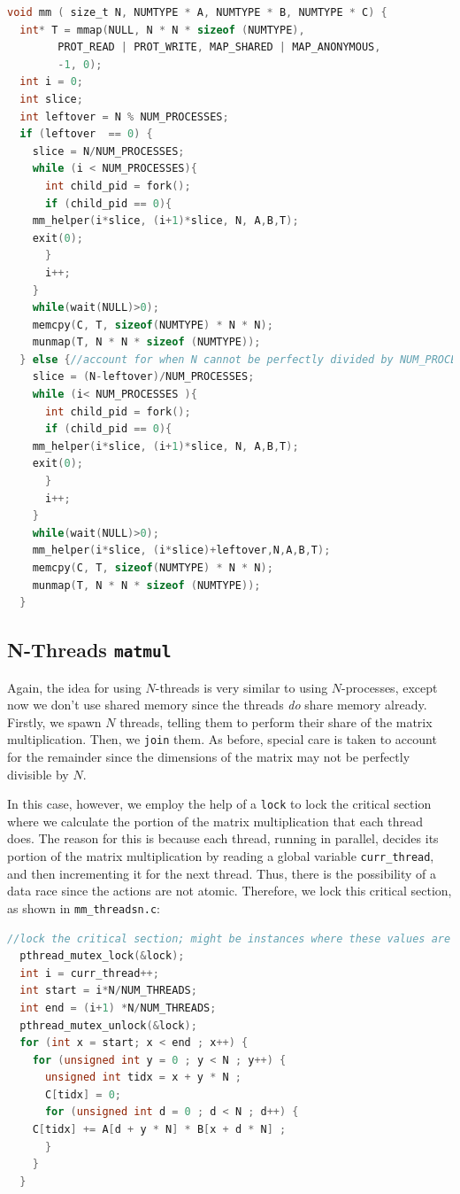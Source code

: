 \documentclass{article}
\begin{document}
\begin{lstlisting}[language=C]
  void mm ( size_t N, NUMTYPE * A, NUMTYPE * B, NUMTYPE * C) {
  int* T = mmap(NULL, N * N * sizeof (NUMTYPE),
		PROT_READ | PROT_WRITE, MAP_SHARED | MAP_ANONYMOUS,
		-1, 0);  
  int i = 0; 
  int slice;
  int leftover = N % NUM_PROCESSES;
  if (leftover  == 0) { 
    slice = N/NUM_PROCESSES;
    while (i < NUM_PROCESSES){
      int child_pid = fork();
      if (child_pid == 0){
	mm_helper(i*slice, (i+1)*slice, N, A,B,T);
	exit(0);
      }
      i++;
    }
    while(wait(NULL)>0);
    memcpy(C, T, sizeof(NUMTYPE) * N * N);
    munmap(T, N * N * sizeof (NUMTYPE));
  } else {//account for when N cannot be perfectly divided by NUM_PROCESSES
    slice = (N-leftover)/NUM_PROCESSES;
    while (i< NUM_PROCESSES ){
      int child_pid = fork();
      if (child_pid == 0){
	mm_helper(i*slice, (i+1)*slice, N, A,B,T);
	exit(0);
      }
      i++;
    }
    while(wait(NULL)>0);
    mm_helper(i*slice, (i*slice)+leftover,N,A,B,T);
    memcpy(C, T, sizeof(NUMTYPE) * N * N);
    munmap(T, N * N * sizeof (NUMTYPE));
  }
\end{lstlisting}
\subsection{N-Threads \texttt{matmul}}
Again, the idea for using $N$-threads is very similar to using $N$-processes, except now we don't use shared memory since the threads \emph{do} share memory already. Firstly, we spawn $N$ threads, telling them to perform their share of the matrix multiplication. Then, we \texttt{join} them. As before, special care is taken to account for the remainder since the dimensions of the matrix may not be perfectly divisible by $N$.

In this case, however, we employ the help of a \texttt{lock} to lock the critical section where we calculate the portion of the matrix multiplication that each thread does. The reason for this is because each thread, running in parallel, decides its portion of the matrix multiplication by reading a global variable \texttt{curr\_thread}, and then incrementing it for the next thread. Thus, there is the possibility of a data race since the actions are not atomic. Therefore, we lock this critical section, as shown in \texttt{mm\_threadsn.c}:

\begin{lstlisting}[language=C]
    //lock the critical section; might be instances where these values are changed before the current thread uses them, affecting correctness of the program
  pthread_mutex_lock(&lock);
  int i = curr_thread++;
  int start = i*N/NUM_THREADS;
  int end = (i+1) *N/NUM_THREADS;
  pthread_mutex_unlock(&lock);
  for (int x = start; x < end ; x++) {
    for (unsigned int y = 0 ; y < N ; y++) {
      unsigned int tidx = x + y * N ;
      C[tidx] = 0;
      for (unsigned int d = 0 ; d < N ; d++) {
	C[tidx] += A[d + y * N] * B[x + d * N] ;
      }
    }
  }
\end{lstlisting}
\end{document}
